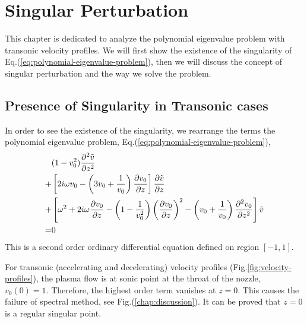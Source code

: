 \chapter{Singular Perturbation} \label{chap:singular-perturbation}
This chapter is dedicated to analyze the polynomial eigenvalue problem with transonic velocity profiles. We will first show the existence of the singularity of Eq.(\ref{eq:polynomial-eigenvalue-problem}), then we will discuss the concept of singular perturbation and the way we solve the problem.

\section{Presence of Singularity in Transonic cases} \label{sec:presence-of-singularity}
In order to see the existence of the singularity, we rearrange the terms the polynomial eigenvalue problem, Eq.(\ref{eq:polynomial-eigenvalue-problem}),
\begin{equation} \label{eq:singular-perturbation-problem}
	\begin{aligned}
		  & (1-v_0^2)\pdv[2]{\tilde{v}}{z}                                                                                                                                        \\
		+ & \left[2i\omega v_0 - \left(3v_0 + \frac{1}{v_0}\right)\pdv{v_0}{z}\right]\pdv{\tilde{v}}{z}                                                                           \\
		+ & \left[\omega^2 + 2i\omega\pdv{v_0}{z} -\left(1 - \frac{1}{v_0^2}\right)\left(\pdv{v_0}{z}\right)^2 - \left(v_0 + \frac{1}{v_0}\right)\pdv[2]{v_0}{z} \right]\tilde{v} \\
		= & 0
	\end{aligned}
\end{equation}
This is a second order ordinary differential equation defined on region $[-1,1]$.

For transonic (accelerating and decelerating) velocity profiles (Fig.\ref{fig:velocity-profiles}), the plasma flow is at sonic point at the throat of the nozzle, $v_0(0)=1$. Therefore, the highest order term vanishes at $z=0$. This causes the failure of spectral method, see Fig.(\ref{chap:discussion}). It can be proved that $z=0$ is a regular singular point.

